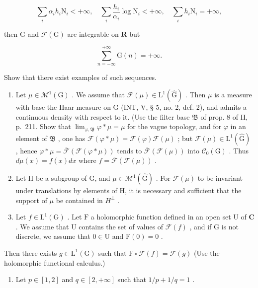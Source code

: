 \[
\sum_ {i} \alpha_ {i} h _ {i} \mathrm{N} _ {i} <   + \infty , \quad \sum_ {i} \frac {h _ {i}}{\alpha_ {i}} \log \mathrm{N} _ {i} <   + \infty , \quad \sum_ {i} h _ {i} \mathrm{N} _ {i} = + \infty ,
\]

then G and \(\mathcal{F}(\mathrm{G})\) are integrable on \(\mathbf{R}\) but

\[
\sum_ {n = - \infty} ^ {+ \infty} \mathrm{G} (n) = + \infty .
\]

Show that there exist examples of such sequences.

\begin{enumerate}
\def\labelenumi{\arabic{enumi})}
\setcounter{enumi}{4}
\item
  Let \(\mu \in \mathcal{M}^1 (\mathrm{G})\) . We assume that \(\mathcal{F}(\mu)\in \mathrm{L}^1 (\widehat{\mathrm{G}})\) . Then \(\mu\) is a measure with base the Haar measure on G (INT, V, § 5, no. 2, def. 2), and admits a continuous density with respect to it. (Use the filter base \(\mathfrak{B}\) of prop. 8 of II, p.~211. Show that \(\lim_{\varphi ,\mathfrak{B}}\varphi *\mu = \mu\) for the vague topology, and for \(\varphi\) in an element of \(\mathfrak{B}\) , one has \(\mathcal{F}(\varphi *\mu) = \mathcal{F}(\varphi)\mathcal{F}(\mu)\) ; but \(\mathcal{F}(\mu)\in \mathrm{L}^1 (\widehat{\mathrm{G}})\) , hence \(\varphi *\mu = \overline{\mathcal{F}} (\mathcal{F}(\varphi *\mu))\) tends to \(\overline{\mathcal{F}} (\mathcal{F}(\mu))\) into \(\mathcal{C}_0(\mathrm{G})\) . Thus \(d\mu (x) = f(x)dx\) where \(f = \overline{\mathcal{F}} (\mathcal{F}(\mu))\) .
\item
  Let H be a subgroup of G, and \(\mu \in \mathcal{M}^{1}(\widehat{\mathrm{G}})\) . For \(\mathcal{F}(\mu)\) to be invariant under translations by elements of H, it is necessary and sufficient that the support of \(\mu\) be contained in \(H^{\perp}\) .
\item
  Let \(f \in \mathrm{L}^1(\mathrm{G})\) . Let \(\mathrm{F}\) a holomorphic function defined in an open set \(\mathrm{U}\) of \(\mathbf{C}\) . We assume that \(\mathrm{U}\) contains the set of values of \(\mathcal{F}(f)\) , and if \(\mathrm{G}\) is not discrete, we assume that \(0 \in \mathrm{U}\) and \(\mathrm{F}(0) = 0\) .
\end{enumerate}

Then there exists \(g \in \mathrm{L}^{1}(\mathrm{G})\) such that \(\mathrm{F} \circ \mathcal{F}(f) = \mathcal{F}(g)\) (Use the holomorphic functional calculus.)

\begin{enumerate}
\def\labelenumi{\arabic{enumi})}
\setcounter{enumi}{7}
\tightlist
\item
  Let \(p \in [1,2]\) and \(q \in [2, +\infty]\) such that \(1/p + 1/q = 1\) .
\end{enumerate}

